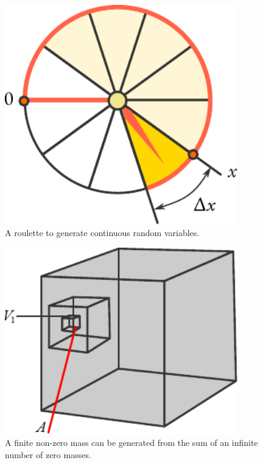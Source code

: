 \begin{figure}%
 \centering
 \includegraphics[width=0.9\textwidth]{figures/roulette.pdf}
\caption{A roulette to generate continuous random variables.\label{roulette}}
 \end{figure}

\begin{figure}%
 \centering
 \includegraphics[width=0.9\textwidth]{figures/cubes.pdf}
\caption{A finite non-zero mass can be generated from the sum of an infinite number of zero masses.\label{cubes}}
 \end{figure}


